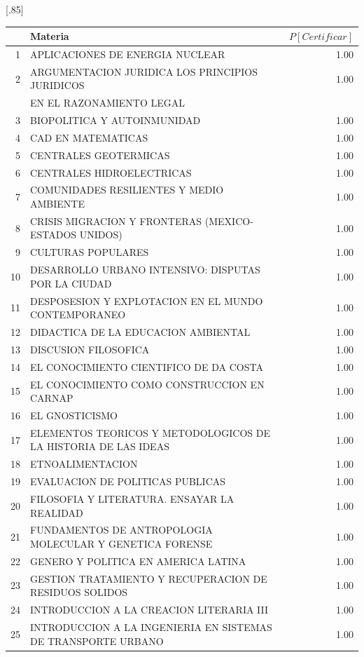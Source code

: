 \documentclass[12pt]{article}
\begin{document}
\begin{table}[ht]
\centering
\scalebox{0.75}[.85]{
\begin{tabular}{rlr}
  \hline
 & Materia & $P[Certificar]$ \\ 
  \hline
1 & APLICACIONES DE ENERGIA NUCLEAR & 1.00 \\ 
  2 & ARGUMENTACION JURIDICA LOS PRINCIPIOS JURIDICOS & 1.00 \\ 
   & EN EL RAZONAMIENTO LEGAL &  \\ 
  3 & BIOPOLITICA Y AUTOINMUNIDAD & 1.00 \\ 
  4 & CAD EN MATEMATICAS & 1.00 \\ 
  5 & CENTRALES GEOTERMICAS & 1.00 \\ 
  6 & CENTRALES HIDROELECTRICAS & 1.00 \\ 
  7 & COMUNIDADES RESILIENTES Y MEDIO AMBIENTE & 1.00 \\ 
  8 & CRISIS MIGRACION Y FRONTERAS (MEXICO-ESTADOS UNIDOS) & 1.00 \\ 
  9 & CULTURAS POPULARES & 1.00 \\ 
  10 & DESARROLLO URBANO INTENSIVO: DISPUTAS POR LA CIUDAD & 1.00 \\ 
  11 & DESPOSESION Y EXPLOTACION EN EL MUNDO CONTEMPORANEO & 1.00 \\ 
  12 & DIDACTICA DE LA EDUCACION AMBIENTAL & 1.00 \\ 
  13 & DISCUSION FILOSOFICA & 1.00 \\ 
  14 & EL CONOCIMIENTO CIENTIFICO DE DA COSTA & 1.00 \\ 
  15 & EL CONOCIMIENTO COMO CONSTRUCCION EN CARNAP & 1.00 \\ 
  16 & EL GNOSTICISMO & 1.00 \\ 
  17 & ELEMENTOS TEORICOS Y METODOLOGICOS DE LA HISTORIA DE LAS IDEAS & 1.00 \\ 
  18 & ETNOALIMENTACION & 1.00 \\ 
  19 & EVALUACION DE POLITICAS PUBLICAS & 1.00 \\ 
  20 & FILOSOFIA Y LITERATURA. ENSAYAR LA REALIDAD & 1.00 \\ 
  21 & FUNDAMENTOS DE ANTROPOLOGIA MOLECULAR Y GENETICA FORENSE & 1.00 \\ 
  22 & GENERO Y POLITICA EN AMERICA LATINA & 1.00 \\ 
  23 & GESTION TRATAMIENTO Y RECUPERACION DE RESIDUOS SOLIDOS & 1.00 \\ 
  24 & INTRODUCCION A LA CREACION LITERARIA III & 1.00 \\ 
  25 & INTRODUCCION A LA INGENIERIA EN SISTEMAS DE TRANSPORTE URBANO & 1.00 \\ 

\end{tabular}}
\end{table}
\end{document}

